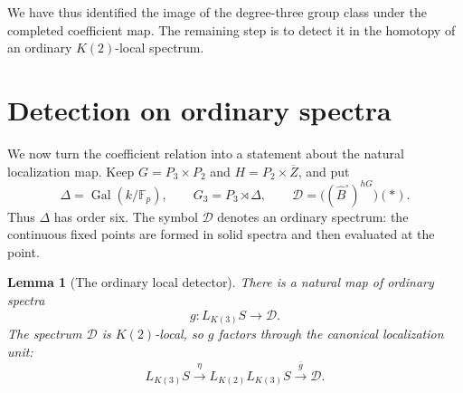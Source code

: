 \documentclass[11pt]{article}
\numberwithin{equation}{section}
\newtheorem{lemma}[theorem]{Lemma}
\theoremstyle{definition}
\theoremstyle{remark}
\newcommand{\F}{\mathbb F}
\DeclareMathOperator{\Gal}{Gal}
\begin{document}
We have thus identified the image of the degree-three group class
under the completed coefficient map.  The remaining step is to
detect it in the homotopy of an ordinary $K(2)$-local spectrum.

\section{Detection on ordinary spectra}
\label{sec:detection}

We now turn the coefficient relation into a statement about the natural
localization map.  Keep $G=P_3\times P_2$ and
$H=P_2\times\overline Z$, and put
\[
 \Delta=\Gal(k/\F_p),\qquad
 G_3=P_3\rtimes\Delta,\qquad
 \mathcal D=\bigl((\widehat B^{\square})^{hG}\bigr)(*).
\]
Thus $\Delta$ has order six.  The symbol $\mathcal D$ denotes an ordinary spectrum:
the continuous fixed points are formed in solid spectra and then evaluated
at the point.

\begin{lemma}[The ordinary local detector]\label{lem:local-detector}
There is a natural map of ordinary spectra
\begin{equation}\label{eq:ordinary-detector}
 g:L_{K(3)}S\longrightarrow\mathcal D.
\end{equation}
The spectrum $\mathcal D$ is $K(2)$-local, so $g$ factors through the canonical
localization unit:
\begin{equation}\label{eq:detector-factorization}
 L_{K(3)}S\xrightarrow{\eta}L_{K(2)}L_{K(3)}S
       \xrightarrow{\overline g}\mathcal D.
\end{equation}
\end{lemma}
\end{document}
